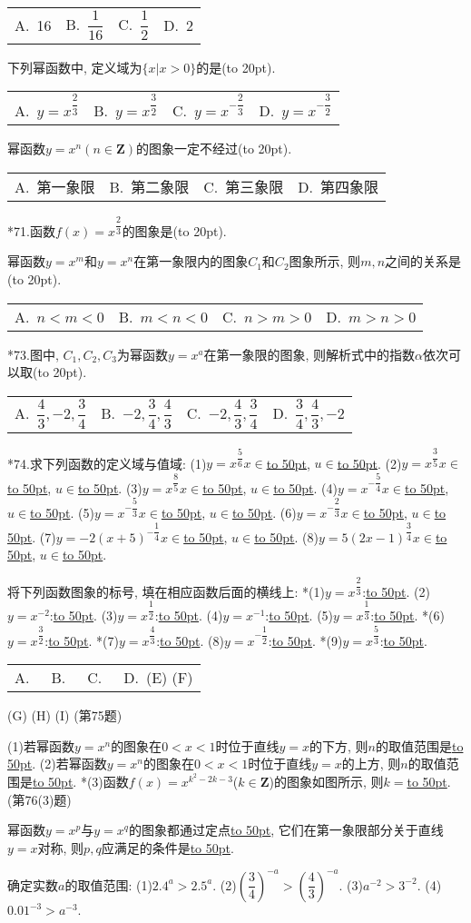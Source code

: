 \documentclass[10pt,a4paper]{article}
\newcommand{\blank}[1]{\underline{\hbox to #1pt{}}}
\newcommand{\bracket}[1]{(\hbox to #1pt{})}
\newcommand{\fourch}[4]{\par\begin{tabular}{p{.23\textwidth}p{.23\textwidth}p{.23\textwidth}p{.23\textwidth}}
A.~#1 &B.~#2& C.~#3& D.~#4
\end{tabular}}
\begin{document}
\begin{enumerate}[1.]
{{    \fourch{16}{$\dfrac 1{16}$}{$\dfrac 12$}{2}
    \item 下列幂函数中, 定义域为$\{x|x>0\}$的是\bracket{20}.
    \fourch{$y={x^{\dfrac 23}}$}{$y={x^{\dfrac 32}}$}{$y={x^{-\dfrac 23}}$}{$y={x^{-\dfrac 32}}$}
    \item 幂函数$y=x^n(n\in \mathbf{Z})$的图象一定不经过\bracket{20}.
    \fourch{第一象限}{第二象限}{第三象限}{第四象限}
    *71.函数$f(x)={x^{\dfrac 23}}$的图象是\bracket{20}.
    \item 幂函数$y=x^m$和$y=x^n$在第一象限内的图象$C_1$和$C_2$图象所示, 则$m,n$之间的关系是\bracket{20}.
    \fourch{$n<m<0$}{$m<n<0$}{$n>m>0$}{$m>n>0$}
    *73.图中, $C_1,C_2,C_3$为幂函数$y=x^a$在第一象限的图象, 则解析式中的指数$\alpha$依次可以取\bracket{20}.
    \fourch{$\dfrac 43,-2,\dfrac 34$}{$-2,\dfrac 34,\dfrac 43$}{$-2,\dfrac 43,\dfrac 34$}{$\dfrac 34,\dfrac 43,-2$}
    *74.求下列函数的定义域与值域:
    (1)$y={x^{\dfrac 56}}x\in$\blank{50}, $u\in$\blank{50}.
    (2)$y={x^{\dfrac 35}}x\in$\blank{50}, $u\in$\blank{50}.
    (3)$y={x^{\dfrac 85}}x\in$\blank{50}, $u\in$\blank{50}.
    (4)$y={x^{-\dfrac 54}}x\in$\blank{50}, $u\in$\blank{50}.
    (5)$y={x^{-\dfrac 53}}x\in$\blank{50}, $u\in$\blank{50}.
    (6)$y={x^{-\dfrac 23}}x\in$\blank{50}, $u\in$\blank{50}.
    (7)$y=-2{{(x+5)}^{-\dfrac 14}}x\in$\blank{50}, $u\in$\blank{50}.
    (8)$y=5{{(2x-1)}^{\dfrac 34}}x\in$\blank{50}, $u\in$\blank{50}.
    \item 将下列函数图象的标号, 填在相应函数后面的横线上:
    *(1)$y={x^{\dfrac 23}}$:\blank{50}.	(2)$y={x^{-2}}$:\blank{50}.
    (3)$y={x^{\dfrac 12}}$:\blank{50}.				(4)$y={x^{-1}}$:\blank{50}.
    (5)$y={x^{\dfrac 13}}$:\blank{50}.				*(6)$y={x^{\dfrac 32}}$:\blank{50}.
    *(7)$y={x^{\dfrac 43}}$:\blank{50}.			(8)$y={x^{-\dfrac 12}}$:\blank{50}.
    *(9)$y={x^{\dfrac 53}}$:\blank{50}.
    \fourch{}{}{}{(E) (F)}
    (G) (H) (I)
    (第75题)
    \item (1)若幂函数$y=x^n$的图象在$0<x<1$时位于直线$y=x$的下方, 则$n$的取值范围是\blank{50}.
    (2)若幂函数$y=x^n$的图象在$0<x<1$时位于直线$y=x$的上方, 则$n$的取值范围是\blank{50}.
    *(3)函数$f(x)={x^{k^2-2k-3}}$($k\in \mathbf{Z}$)的图象如图所示, 则$k=$\blank{50}.
    (第76(3)题)
    \item 幂函数$y=x^p$与$y=x^q$的图象都通过定点\blank{50}, 它们在第一象限部分关于直线$y=x$对称, 则$p,q$应满足的条件是\blank{50}.
    \item 确定实数$a$的取值范围:
    (1)${{2.4}^a}>{{2.5}^a}.$				(2)$(\dfrac 34)^{-a}>(\dfrac 43)^{-a}.$
    (3)${a^{-2}}>{3^{-2}}.$				(4)${{0.01}^{-3}}>{a^{-3}}.$
}}
\end{enumerate}
\end{document}
